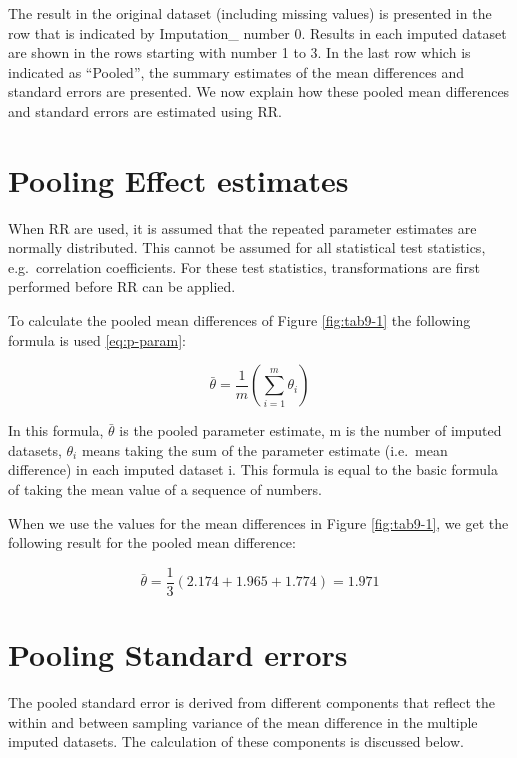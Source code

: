 \documentclass[]{book}
\begin{document}
The result in the original dataset (including missing values) is
presented in the row that is indicated by Imputation\_ number 0. Results
in each imputed dataset are shown in the rows starting with number 1 to
3. In the last row which is indicated as ``Pooled'', the summary
estimates of the mean differences and standard errors are presented. We
now explain how these pooled mean differences and standard errors are
estimated using RR.

\section{Pooling Effect estimates}\label{pooling-effect-estimates}

When RR are used, it is assumed that the repeated parameter estimates
are normally distributed. This cannot be assumed for all statistical
test statistics, e.g.~correlation coefficients. For these test
statistics, transformations are first performed before RR can be
applied.

To calculate the pooled mean differences of Figure \ref{fig:tab9-1} the
following formula is used \eqref{eq:p-param}:

\begin{equation}
  \bar{\theta} = \frac{1}{m}\left (\sum_{i=1}^m{\theta_i}\right )
  \label{eq:p-param}
\end{equation}

In this formula, \(\bar{\theta}\) is the pooled parameter estimate, m is
the number of imputed datasets, \(\theta_i\) means taking the sum of the
parameter estimate (i.e.~mean difference) in each imputed dataset i.
This formula is equal to the basic formula of taking the mean value of a
sequence of numbers.

When we use the values for the mean differences in Figure
\ref{fig:tab9-1}, we get the following result for the pooled mean
difference:

\[\bar{\theta} = \frac{1}{3}(2.174 + 1.965+1.774)=1.971\]

\section{Pooling Standard errors}\label{pooling-standard-errors}

The pooled standard error is derived from different components that
reflect the within and between sampling variance of the mean difference
in the multiple imputed datasets. The calculation of these components is
discussed below.
\end{document}
